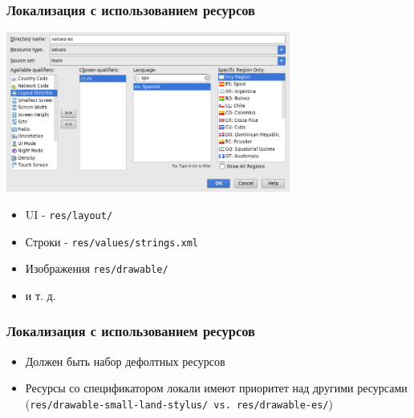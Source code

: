 \documentclass{beamer}
\begin{document}
\begin{frame}
    \frametitle{Локализация с использованием ресурсов}
    \begin{center}
        \includegraphics[width=0.7\textwidth,keepaspectratio]{images/resources}
    \end{center}
    \begin{itemize}
        \item UI - \texttt{res/layout/}
        \item Строки - \texttt{res/values/strings.xml}
        \item Изображения \texttt{res/drawable/}
        \item и т. д.
    \end{itemize}
\end{frame}

\begin{frame}
    \frametitle{Локализация с использованием ресурсов}
    \begin{itemize}
        \item Должен быть набор дефолтных ресурсов
        \item Ресурсы со спецификатором локали имеют приоритет над другими ресурсами
            (\texttt{res/drawable-small-land-stylus/ vs. res/drawable-es/})
    \end{itemize}
\end{frame}
\end{document}
